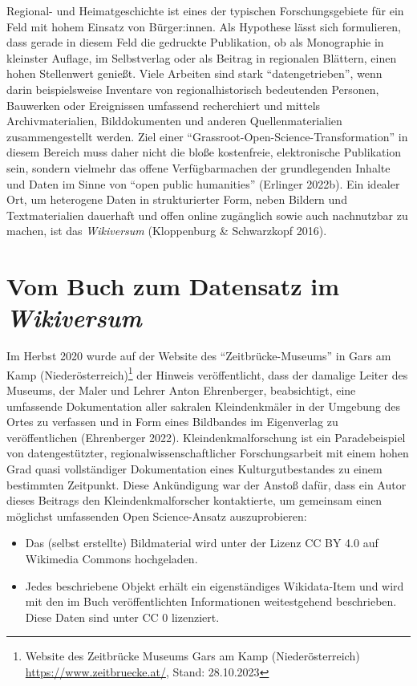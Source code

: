 \documentclass[a4paper,
fontsize=11pt,
oneside,
numbers=noperiodatend,
parskip=half-,
bibliography=totoc,
final
]{scrartcl}
\begin{document}
Regional- und Heimatgeschichte ist eines der typischen Forschungsgebiete
für ein Feld mit hohem Einsatz von Bürger:innen. Als Hypothese lässt
sich formulieren, dass gerade in diesem Feld die gedruckte Publikation,
ob als Monographie in kleinster Auflage, im Selbstverlag oder als
Beitrag in regionalen Blättern, einen hohen Stellenwert genießt. Viele
Arbeiten sind stark \enquote{datengetrieben}, wenn darin beispielsweise
Inventare von regionalhistorisch bedeutenden Personen, Bauwerken oder
Ereignissen umfassend recherchiert und mittels Archivmaterialien,
Bilddokumenten und anderen Quellenmaterialien zusammengestellt werden.
Ziel einer \enquote{Grassroot-Open-Science-Transformation} in diesem
Bereich muss daher nicht die bloße kostenfreie, elektronische
Publikation sein, sondern vielmehr das offene Verfügbarmachen der
grundlegenden Inhalte und Daten im Sinne von \enquote{open public
humanities} (Erlinger 2022b). Ein idealer Ort, um heterogene Daten in
strukturierter Form, neben Bildern und Textmaterialien dauerhaft und
offen online zugänglich sowie auch nachnutzbar zu machen, ist das
\emph{Wikiversum} (Kloppenburg \& Schwarzkopf 2016).

\hypertarget{vom-buch-zum-datensatz-im-wikiversum}{%
\section{\texorpdfstring{Vom Buch zum Datensatz im
\emph{Wikiversum}}{Vom Buch zum Datensatz im Wikiversum}}\label{vom-buch-zum-datensatz-im-wikiversum}}

Im Herbst 2020 wurde auf der Website des \enquote{Zeitbrücke-Museums} in
Gars am Kamp (Niederösterreich)\footnote{Website des Zeitbrücke Museums
  Gars am Kamp (Niederösterreich) \url{https://www.zeitbruecke.at/},
  Stand: 28.10.2023} der Hinweis veröffentlicht, dass der damalige
Leiter des Museums, der Maler und Lehrer Anton Ehrenberger,
beabsichtigt, eine umfassende Dokumentation aller sakralen
Kleindenkmäler in der Umgebung des Ortes zu verfassen und in Form eines
Bildbandes im Eigenverlag zu veröffentlichen (Ehrenberger 2022).
Kleindenkmalforschung ist ein Paradebeispiel von datengestützter,
regionalwissenschaftlicher Forschungsarbeit mit einem hohen Grad quasi
vollständiger Dokumentation eines Kulturgutbestandes zu einem bestimmten
Zeitpunkt. Diese Ankündigung war der Anstoß dafür, dass ein Autor dieses
Beitrags den Kleindenkmalforscher kontaktierte, um gemeinsam einen
möglichst umfassenden Open Science-Ansatz auszuprobieren:

\begin{itemize}
\item
  Das (selbst erstellte) Bildmaterial wird unter der Lizenz CC BY 4.0
  auf Wikimedia Commons hochgeladen.
\item
  Jedes beschriebene Objekt erhält ein eigenständiges Wikidata-Item und
  wird mit den im Buch veröffentlichten Informationen weitestgehend
  beschrieben. Diese Daten sind unter CC 0 lizenziert.
\end{itemize}
\end{document}
